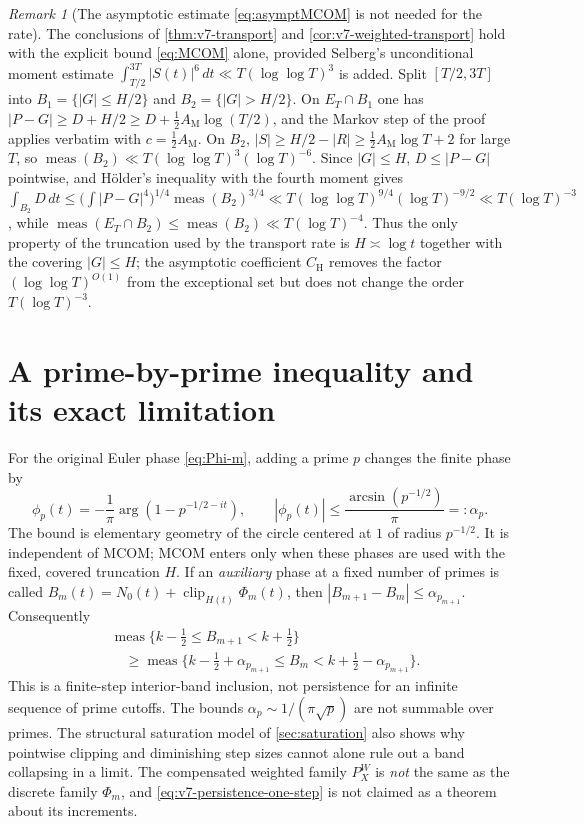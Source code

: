 \documentclass[11pt,a4paper]{article}
\numberwithin{equation}{section}
\theoremstyle{definition}
\theoremstyle{remark}
\newtheorem{remark}[theorem]{Remark}
\newcommand{\meas}{\operatorname{meas}}
\newcommand{\clip}{\operatorname{clip}}
\begin{document}
\begin{remark}[The asymptotic estimate \eqref{eq:asymptMCOM} is not needed for the rate]
\label{rem:v8-transport-noasympt}
The conclusions of \cref{thm:v7-transport} and
\cref{cor:v7-weighted-transport} hold with the explicit bound
\eqref{eq:MCOM} alone, provided Selberg's unconditional moment
estimate $\int_{T/2}^{3T}|S(t)|^{6}\,dt\ll T(\log\log T)^3$
\cite{Selberg1946} is added. Split $[T/2,3T]$ into
$B_1=\{|G|\le H/2\}$ and $B_2=\{|G|>H/2\}$. On $E_T\cap B_1$ one has
$|P-G|\ge D+H/2\ge D+\tfrac12A_{\mathrm M}\log(T/2)$, and the Markov
step of the proof applies verbatim with $c=\tfrac12A_{\mathrm M}$.
On $B_2$, $|S|\ge H/2-|R|\ge\tfrac12A_{\mathrm M}\log T+2$ for large
$T$, so $\meas(B_2)\ll T(\log\log T)^3(\log T)^{-6}$. Since $|G|\le H$,
$D\le|P-G|$ pointwise, and H\"older's inequality with the fourth
moment gives
$\int_{B_2}D\,dt\le\bigl(\int|P-G|^4\bigr)^{1/4}\meas(B_2)^{3/4}
\ll T(\log\log T)^{9/4}(\log T)^{-9/2}\ll T(\log T)^{-3}$,
while $\meas(E_T\cap B_2)\le\meas(B_2)\ll T(\log T)^{-4}$.
Thus the only property of the truncation used by the transport rate
is $H\asymp\log t$ together with the covering $|G|\le H$; the
asymptotic coefficient $C_{\mathrm H}$ removes the factor
$(\log\log T)^{O(1)}$ from the exceptional set but does not change
the order $T(\log T)^{-3}$.
\end{remark}

\section{A prime-by-prime inequality and its exact limitation}
\label{sec:v7-prime-step}
For the original Euler phase \eqref{eq:Phi-m}, adding a prime
$p$ changes the finite phase by
\begin{equation}\label{eq:v7-single-prime}
 \phi_p(t)=-\frac1\pi\arg(1-p^{-1/2-it}),\qquad
 |\phi_p(t)|\le\frac{\arcsin(p^{-1/2})}{\pi}=:\alpha_p.
\end{equation}
The bound is elementary geometry of the circle centered at $1$
of radius $p^{-1/2}$. It is independent of MCOM; MCOM enters only
when these phases are used with the fixed, covered truncation $H$.
If an \emph{auxiliary} phase at a fixed number of primes is called
$B_m(t)=N_0(t)+\clip_{H(t)}\Phi_m(t)$, then
$|B_{m+1}-B_m|\le\alpha_{p_{m+1}}$. Consequently
\begin{equation}\label{eq:v7-persistence-one-step}
\begin{split}
&\meas\{k-\tfrac12\le B_{m+1}<k+\tfrac12\}\\
&\quad\ge \meas\{k-\tfrac12+\alpha_{p_{m+1}}
\le B_m<k+\tfrac12-\alpha_{p_{m+1}}\}.
\end{split}
\end{equation}
This is a finite-step interior-band inclusion, not persistence
for an infinite sequence of prime cutoffs. The bounds
$\alpha_p\sim1/(\pi\sqrt p)$ are not summable over primes.
The structural saturation model of \cref{sec:saturation} also
shows why pointwise clipping and diminishing step sizes cannot
alone rule out a band collapsing in a limit. The compensated
weighted family $P_X^W$ is \emph{not} the same as the discrete
family $\Phi_m$, and \eqref{eq:v7-persistence-one-step} is not
claimed as a theorem about its increments.
\end{document}
